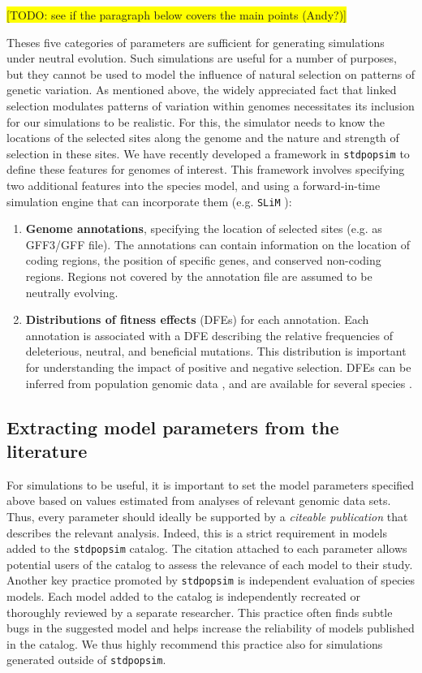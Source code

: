 \documentclass[hidelinks]{article}
\newcommand{\stdpopsim}{\texttt{stdpopsim}\xspace}
\begin{document}
\colorbox{yellow}{[TODO: see if the paragraph below covers the main points (Andy?)]}

Theses five categories of parameters are sufficient for generating simulations
under neutral evolution. Such simulations are useful for a number of purposes,
but they cannot be used to model the influence of natural selection on patterns of genetic variation.
As mentioned above, the widely appreciated fact that linked selection modulates
patterns of variation within genomes necessitates its inclusion for our simulations to be
realistic. For this, the simulator needs to know
the locations of the selected sites along the genome and the nature and strength
of selection in these sites. We have recently developed a framework in \stdpopsim
to define these features for genomes of interest.
This framework involves specifying two additional features into the species model,
and using a forward-in-time simulation engine that can incorporate
them (e.g. \texttt{SLiM} \citep{Haller2019}):

\begin{enumerate}
	\def\labelenumi{\arabic{enumi}.}
	\setcounter{enumi}{5}
	\item
	\textbf{Genome annotations}, specifying the location of selected sites (e.g. as GFF3/GFF file).
  The annotations can contain information on the location of coding regions,
  the position of specific genes, and conserved non-coding regions.
  Regions not covered by the annotation file are assumed to be neutrally evolving.
	\item
	\textbf{Distributions of fitness effects} (DFEs) for each annotation.
  Each annotation is associated with a DFE describing the relative frequencies of deleterious,
  neutral, and beneficial mutations. This distribution is important for understanding
  the impact of positive and negative selection. DFEs can be inferred from population
  genomic data \citep[reviewed in][]{Eyre-Walker2007}, and are available for several species \citep[e.g.][]{Ma2013, Huber2018}.
\end{enumerate}

\subsection*{Extracting model parameters from the literature}
%
%
For simulations to be useful, it is important to set the model parameters
specified above based on values estimated from analyses of relevant genomic data sets.
Thus, every parameter should ideally be supported by a \emph{citeable publication} that
describes the relevant analysis.
Indeed, this is a strict requirement in models added to the \stdpopsim catalog.
The citation attached to each parameter allows potential users of the catalog to
assess the relevance of each model to their study. Another key practice promoted by \stdpopsim
is independent evaluation of species models.
Each model added to the catalog is independently recreated or thoroughly reviewed by a separate researcher.
This practice often finds subtle bugs in the suggested model and helps increase
the reliability of models published in the catalog.
We thus highly recommend this practice also for simulations generated outside of \stdpopsim.
\end{document}

